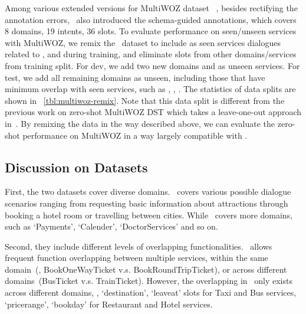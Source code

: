 Among various extended versions for MultiWOZ
dataset~\cite[2.0-2.3,][]{budzianowski2018multiwoz,
  eric2020multiwoz,zang-etal-2020-multiwoz,han2020multiwoz} , besides
rectifying the annotation errors, \multiwoz ~also introduced the
schema-guided annotations, which covers 8 domains, 19 intents, 36
slots.  To evaluate performance on seen/unseen services with MultiWOZ,
we remix the \multiwoz~dataset to include as seen services dialogues
related to ,  and 
during training, and eliminate slots from other domains/services from
training split.  For dev, we add two new domains  and  as unseen services. For test, we add all remaining domains as
unseen, including those that have minimum overlap with seen services,
such as , , . The statistics of
data splits are shown in
~\autoref{tbl:multiwoz-remix}. Note that this data split
is different from the previous work on zero-shot MultiWOZ DST which
takes a leave-one-out approach in~\citet{wu2019transferable}. By
remixing the data in the way described above, we can evaluate the
zero-shot performance on MultiWOZ in a way largely compatible with
\sgdst.

\subsection{Discussion on Datasets}
\label{ssec:sgd:discussion-datasets}

First, the two datasets cover diverse domains. \multiwoz~covers
various possible dialogue scenarios ranging from requesting basic
information about attractions through booking a hotel room or
travelling between cities. While \sgdst~covers more domains, such as
`Payments', `Calender', `DoctorServices' and so on.

Second, they include different levels of overlapping
functionalities. \sgdst~allows frequent function overlapping between
multiple services, within the same domain~(\eg, BookOneWayTicket
v.s. BookRoundTripTicket), or across different domains~(BusTicket
v.s. TrainTicket). However, the overlapping in \multiwoz~only exists
across different domains, \eg, `destination', `leaveat' slots for
Taxi and Bus services, `pricerange', `bookday' for Restaurant and
Hotel services.

